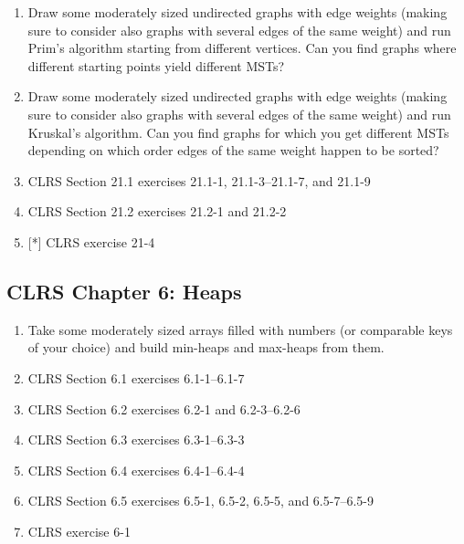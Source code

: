 \documentclass[12pt,a4paper]{article}
\theoremstyle{plain}
\theoremstyle{definition}
\begin{document}
\begin{enumerate}

 
\item
  Draw some moderately sized undirected graphs
  with edge weights (making sure to consider also graphs with several
  edges of the same weight) and run Prim's algorithm starting from
  different vertices. Can you find graphs where different starting
  points yield different MSTs?


\item
  Draw some moderately sized undirected graphs
  with edge weights (making sure to consider also graphs with several
  edges of the same weight) and run Kruskal's algorithm.
  Can you find graphs for which you get different MSTs depending on
  which order edges of the same weight happen to be sorted?


\item
  CLRS Section 21.1 exercises
  21.1-1,
  21.1-3--21.1-7,
  and
  21.1-9

\item
  CLRS Section 21.2 exercises
  21.2-1 and
  21.2-2

\item{}[*]
  CLRS
  exercise
  21-4


%   
%   
%   

\end{enumerate}


\subsection*{CLRS Chapter 6: Heaps}

\begin{enumerate}
\item
  Take some moderately sized arrays filled with numbers (or comparable
  keys of your choice) and build min-heaps and max-heaps from them.

\item
  CLRS Section 6.1 exercises
  6.1-1--6.1-7

\item
  CLRS Section 6.2 exercises
  6.2-1
  and
  6.2-3--6.2-6

\item
  CLRS Section 6.3 exercises
  6.3-1--6.3-3

\item
  CLRS Section 6.4 exercises
  6.4-1--6.4-4

\item
  CLRS Section 6.5 exercises
  6.5-1,
  6.5-2,
  6.5-5,
  and
  6.5-7--6.5-9

\item
  CLRS  exercise 6-1

\end{enumerate}
\end{document}

